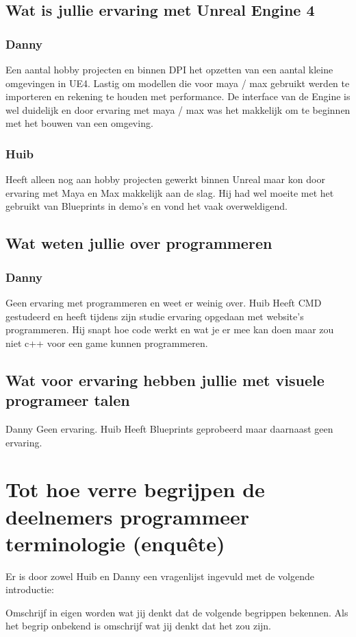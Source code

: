 \subsection*{Wat is jullie ervaring met Unreal Engine 4}
\subsubsection*{Danny}
Een aantal hobby projecten en binnen DPI het opzetten van een aantal kleine omgevingen in UE4. Lastig om modellen die voor maya / max gebruikt werden te importeren en rekening te houden met performance. De interface van de Engine is wel duidelijk en door ervaring met maya / max was het makkelijk om te beginnen met het bouwen van een omgeving.
\subsubsection*{Huib}
Heeft alleen nog aan hobby projecten gewerkt binnen Unreal maar kon door ervaring met Maya en Max makkelijk aan de slag. Hij had wel moeite met het gebruikt van Blueprints in demo’s en vond het vaak overweldigend.
\subsection*{Wat weten jullie over programmeren}
\subsubsection*{Danny}
Geen ervaring met programmeren en weet er weinig over.
Huib
Heeft CMD gestudeerd en heeft tijdens zijn studie ervaring opgedaan met website’s programmeren. Hij snapt hoe code werkt en wat je er mee kan doen maar zou niet c++ voor een game kunnen programmeren.
\subsection*{Wat voor ervaring hebben jullie met visuele programeer talen}
Danny
Geen ervaring.
Huib
Heeft Blueprints geprobeerd maar daarnaast geen ervaring.

\section[Enquête]{Tot hoe verre begrijpen de deelnemers programmeer terminologie (enquête)}
Er is door zowel Huib en Danny een vragenlijst ingevuld met de volgende introductie:

Omschrijf in eigen worden wat jij denkt dat de volgende begrippen bekennen. Als het begrip onbekend is omschrijf wat jij denkt dat het zou zijn.

